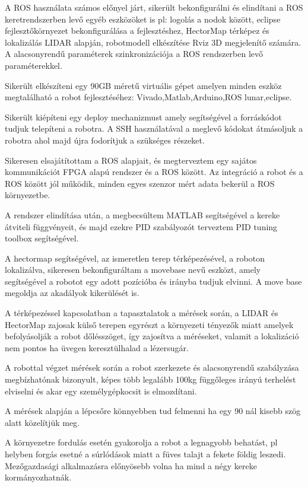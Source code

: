 A ROS használata számos előnyel járt, sikerült bekonfigurálni és elindítani a ROS keretrendszerben levő egyéb eszközöket is pl: logolás a nodok között, eclipse fejlesztőkörnyezet bekonfigurálása a fejlesztéshez, HectorMap térképez és lokalizálás LIDAR alapján, robotmodell elkészítése Rviz 3D megjelenítő számára. A alacsonyrendű paraméterek szinkronizációja a ROS rendszerben levő paraméterekkel.

Sikerült elkészíteni egy 90GB méretű virtuális gépet amelyen minden eszköz megtalálható a robot fejlesztéséhez: Vivado,Matlab,Arduino,ROS lunar,eclipse.

Sikerült kiépíteni egy deploy mechanizmust amely segítségével a forráskódot tudjuk telepíteni a robotra. A SSH használatával a meglevő kódokat átmásoljuk a robotra ahol majd újra fodorítjuk a szükséges részeket.

Sikeresen elsajátítottam a ROS alapjait, és megterveztem egy sajátos kommunikációt FPGA alapú rendszer és a ROS között. Az integráció a robot és a ROS között jól működik, minden egyes szenzor mért adata bekerül a ROS környezetbe.

A rendszer elindítása után, a megbecsültem MATLAB segítségével a kereke átviteli függvényeit, és majd ezekre PID szabályozót terveztem PID tuning toolbox segítségével.

A hectormap segítségével, az ismeretlen terep térképezésével, a roboton lokalizálva, sikeresen bekonfiguráltam a movebase nevű eszközt, amely segítségével a robotot egy adott pozícióba és irányba tudjuk elvinni. A move base megoldja az akadályok kikerülését is.

A térképezéssel kapcsolatban a tapasztalatok a mérések során, a LIDAR és HectorMap zajosak külső terepen egyrészt a környezeti tényezők miatt amelyek befolyásolják a robot dőlésszöget, így zajosítva a méréseket, valamit a lokalizáció nem pontos ha üvegen keresztülhalad a lézersugár.

A robottal végzet mérések során a robot szerkezete és alacsonyrendű szabályzása megbízhatónak bizonyult, képes több legalább 100kg függőleges irányú terhelést elviselni és akar egy személygépkocsit is elmozdítani.

A mérések alapján a lépcsőre könnyebben tud felmenni ha egy 90 \degree nál kisebb szög alatt közelítjük meg.

A környezetre fordulás esetén gyakorolja a robot a legnagyobb behatást, pl helyben forgás esetné a súrlódások miatt a füves talajt a fekete földig leszedi. Mezőgazdasági alkalmazásra előnyösebb volna ha mind a négy kereke kormányozhatnák.

